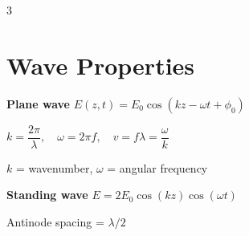 \documentclass[9pt]{extarticle}
\newcommand{\eqlabel}[1]{\textbf{\scriptsize #1}\;}
\newcommand{\vardef}[1]{{\footnotesize\color{defgray}#1}}
\begin{document}
\begin{multicols}{3}
\section{Wave Properties}
\eqlabel{Plane wave} $E(z,t) = E_0\cos(kz - \omega t + \phi_0)$

$k = \dfrac{2\pi}{\lambda},\quad \omega = 2\pi f,\quad v = f\lambda = \dfrac{\omega}{k}$

\vardef{$k$ = wavenumber, $\omega$ = angular frequency}

\eqlabel{Standing wave} $E = 2E_0\cos(kz)\cos(\omega t)$

\vardef{Antinode spacing = $\lambda/2$}

\end{multicols}
\newpage

\end{document}
